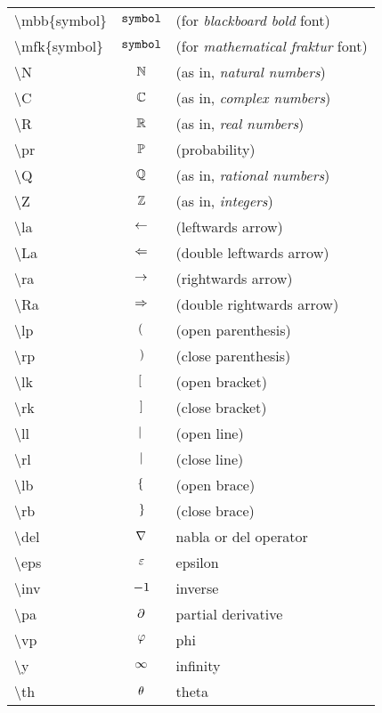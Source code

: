 \noindent
\begin{tabular}{lcl}

\textbackslash mbb\{symbol\} & $\mathbb{\mathtt{symbol}}$ & (for \emph{blackboard bold} font) \\
\textbackslash mfk\{symbol\} & $\mathfrak{\mathtt{symbol}}$ & (for \emph{mathematical fraktur} font) \\
\textbackslash N & $\mathbb{N}$ & (as in, \emph{natural numbers}) \\
\textbackslash C & $\mathbb{C}$ & (as in, \emph{complex numbers}) \\
\textbackslash R & $\mathbb{R}$ & (as in, \emph{real numbers}) \\
\textbackslash pr & $\mathbb{P}$ & (probability) \\
\textbackslash Q & $\mathbb{Q}$ & (as in, \emph{rational numbers}) \\
\textbackslash Z & $\mathbb{Z}$ & (as in, \emph{integers}) \\
\textbackslash la & $\leftarrow$ & (leftwards arrow) \\
\textbackslash La & $\Leftarrow$ & (double leftwards arrow) \\
\textbackslash ra & $\rightarrow$ & (rightwards arrow) \\
\textbackslash Ra & $\Rightarrow$ & (double rightwards arrow) \\
\textbackslash lp & $\lp\r.$ & (open parenthesis) \\
\textbackslash rp & $\l.\rp$ & (close parenthesis) \\
\textbackslash lk & $\lk\r.$ & (open bracket) \\
\textbackslash rk & $\l.\rk$ & (close bracket) \\
\textbackslash ll & $\ll\r.$ & (open line) \\
\textbackslash rl & $\l.\rl$ & (close line) \\
\textbackslash lb & $\lb\r.$ & (open brace) \\
\textbackslash rb & $\l.\rb$ & (close brace) \\
\textbackslash del & $\nabla$ & nabla or del operator \\
\textbackslash eps & $\varepsilon$ & epsilon \\
\textbackslash inv & ${-1}$ & inverse \\
\textbackslash pa & $\partial$ & partial derivative \\
\textbackslash vp & $\varphi$ & phi \\
\textbackslash y & $\infty$ & infinity \\
\textbackslash th & $\theta$ & theta \\
\end{tabular}


